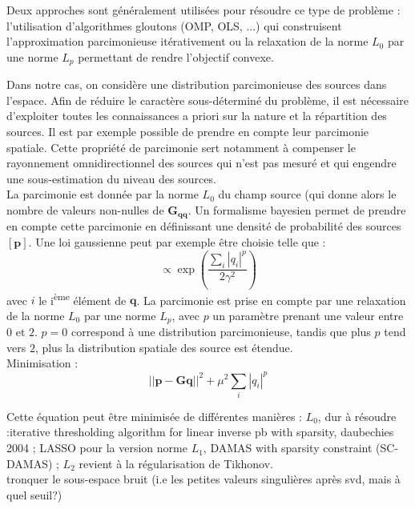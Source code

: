 Deux approches sont généralement utilisées pour résoudre ce type de problème : l'utilisation d'algorithmes gloutons (OMP, OLS, ...) qui construisent l'approximation parcimonieuse itérativement ou la relaxation de la norme $L_0$ par une norme $L_p$ permettant de rendre l'objectif convexe.


Dans notre cas, on considère une distribution parcimonieuse des sources dans l'espace. Afin de réduire le caractère sous-déterminé du problème, il est nécessaire d'exploiter toutes les connaissances a priori sur la nature et la répartition des sources. Il est par exemple possible de prendre en compte leur parcimonie spatiale. Cette propriété de parcimonie sert notamment à compenser le rayonnement omnidirectionnel des sources qui n'est pas mesuré et qui engendre une sous-estimation du niveau des sources. \\
La parcimonie est donnée par la norme $L_0$ du champ source (qui donne alors le nombre de valeurs non-nulles de $\bm{G_{qq}}$. Un formalisme bayesien permet de prendre en compte cette parcimonie en définissant une densité de probabilité des sources $[\bm{p}]$. Une loi gaussienne peut par exemple être choisie telle que : 
\begin{equation}
 [\bm{p}] \propto \exp\left(\frac{\sum_i |q_i|^p}{2\gamma^2}\right)
\end{equation}
avec $i$ le i\textsuperscript{ème} élément de $\bm{q}$. La parcimonie est prise en compte par une relaxation de la norme $L_0$ par une norme $L_p$, avec $p$ un paramètre prenant une valeur entre $0$ et $2$. $p=0$ correspond à une distribution parcimonieuse, tandis que plus $p$ tend vers $2$, plus la distribution spatiale des source est étendue.\\

Minimisation : 
\begin{equation}
	||\bm{p}-\bm{G}\bm{q}||^2 + \mu^2\sum_i |q_i|^p
\end{equation}

Cette équation peut être minimisée de différentes manières : $L_0$, dur à résoudre :iterative thresholding algorithm for linear inverse pb with sparsity, daubechies 2004 ; LASSO pour la version norme $L_1$, DAMAS with sparsity constraint (SC-DAMAS) ; $L_2$ revient à la régularisation de Tikhonov.  \\





tronquer le sous-espace bruit (i.e les petites valeurs singulières après svd, mais à quel seuil?)


